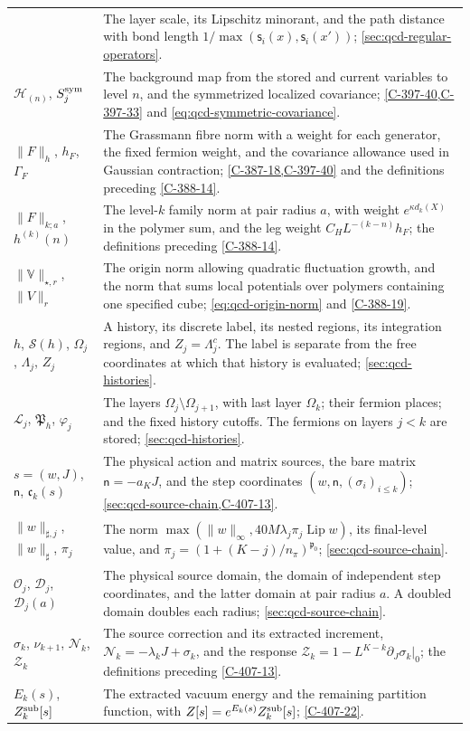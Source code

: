 \documentclass[11pt,letterpaper,reqno]{amsart}
\theoremstyle{definition}
\theoremstyle{remark}
\begin{document}
\begin{longtable}{@{}p{}@{\hspace{0.025\textwidth}}p{}@{}}
& The layer scale, its Lipschitz minorant, and the path distance
with bond length $1/\max(\mathsf s_i(x),\mathsf s_i(x'))$;
\cref{sec:qcd-regular-operators}.\\
$\mathcal H_{(n)}$, $S_j^{\rm sym}$
& The background map from the stored and current variables to
level $n$, and the symmetrized localized covariance;
\cref{C-397-40,C-397-33} and
\eqref{eq:qcd-symmetric-covariance}.\\
$\|F\|_h$, $h_F$, $\Gamma_F$
& The Grassmann fibre norm with a weight for each generator,
the fixed fermion weight, and the covariance allowance used
in Gaussian contraction; \cref{C-387-18,C-397-40} and the
definitions preceding \cref{C-388-14}.\\
$\|F\|_{k;a}$, $h^{(k)}(n)$
& The level-$k$ family norm at pair radius $a$, with weight
$e^{\kappa d_k(X)}$ in the polymer sum, and the leg weight
$C_HL^{-(k-n)}h_F$; the definitions preceding \cref{C-388-14}.\\
$\|\mathbb V\|_{\star,r}$, $\|V\|_r$
& The origin norm allowing quadratic fluctuation growth, and
the norm that sums local potentials over polymers containing
one specified cube; \eqref{eq:qcd-origin-norm} and
\cref{C-388-19}.\\
$h$, $\mathcal S(h)$, $\Omega_j$, $\Lambda_j$, $Z_j$
& A history, its discrete label, its nested regions, its integration
regions, and $Z_j=\Lambda_j^c$. The label is separate from
the free coordinates at which that history is evaluated;
\cref{sec:qcd-histories}.\\
$\mathcal L_j$, $\mathfrak P_h$, $\varphi_j$
& The layers $\Omega_j\setminus\Omega_{j+1}$, with last layer
$\Omega_k$; their fermion places; and the fixed history cutoffs.
The fermions on layers $j<k$ are stored;
\cref{sec:qcd-histories}.\\
$s=(w,J)$, $\mathsf n$, $\mathfrak c_k(s)$
& The physical action and matrix sources, the bare matrix
$\mathsf n=-a_KJ$, and the step coordinates
$(w,\mathsf n,(\sigma_i)_{i\le k})$;
\cref{sec:qcd-source-chain,C-407-13}.\\
$\|w\|_{\sharp,j}$, $\|w\|_\sharp$, $\pi_j$
& The norm
$\max(\|w\|_\infty,40M\lambda_j\pi_j\operatorname{Lip}w)$,
its final-level value, and
$\pi_j=(1+(K-j)/n_\pi)^{\mathfrak p_0}$;
\cref{sec:qcd-source-chain}.\\
$\mathscr O_j$, $\mathscr D_j$, $\mathscr D_j(a)$
& The physical source domain, the domain of independent step
coordinates, and the latter domain at pair radius $a$.
A doubled domain doubles each radius;
\cref{sec:qcd-source-chain}.\\
$\sigma_k$, $\nu_{k+1}$, $\mathcal N_k$, $\mathcal Z_k$
& The source correction and its extracted increment,
$\mathcal N_k=-\lambda_kJ+\sigma_k$, and the response
$\mathcal Z_k=1-L^{K-k}\partial_J\sigma_k|_0$;
the definitions preceding \cref{C-407-13}.\\
$E_k(s)$, $Z_k^{\rm sub}[s]$
& The extracted vacuum energy and the remaining partition
function, with $Z[s]=e^{E_k(s)}Z_k^{\rm sub}[s]$;
\cref{C-407-22}.\\
\end{longtable}
\endgroup
\end{document}
